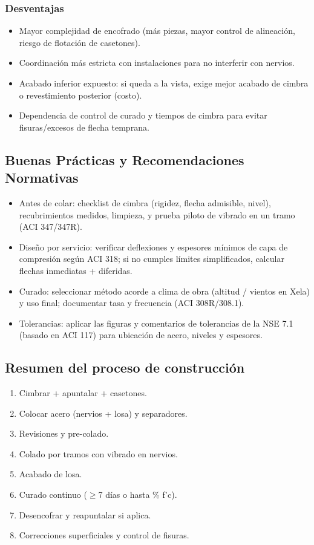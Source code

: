 \documentclass[12pt,a4paper]{article}
\begin{document}
	\subsubsection{Desventajas}
	\begin{itemize}
		\item Mayor complejidad de encofrado (más piezas, mayor control de alineación, riesgo de flotación de casetones).
		\item Coordinación más estricta con instalaciones para no interferir con nervios.
		\item Acabado inferior expuesto: si queda a la vista, exige mejor acabado de cimbra o revestimiento posterior (costo).
		\item Dependencia de control de curado y tiempos de cimbra para evitar fisuras/excesos de flecha temprana.
	\end{itemize}
	
	\subsection{Buenas Prácticas y Recomendaciones Normativas}
	\begin{itemize}
		\item Antes de colar: checklist de cimbra (rigidez, flecha admisible, nivel), recubrimientos medidos, limpieza, y prueba piloto de vibrado en un tramo (ACI 347/347R).
		\item Diseño por servicio: verificar deflexiones y espesores mínimos de capa de compresión según ACI 318; si no cumples límites simplificados, calcular flechas inmediatas + diferidas.
		\item Curado: seleccionar método acorde a clima de obra (altitud / vientos en Xela) y uso final; documentar tasa y frecuencia (ACI 308R/308.1).
		\item Tolerancias: aplicar las figuras y comentarios de tolerancias de la NSE 7.1 (basado en ACI 117) para ubicación de acero, niveles y espesores.
	\end{itemize}
	
	\subsection{Resumen del proceso de construcción}
	\begin{enumerate}
		\item Cimbrar + apuntalar + casetones.
		\item Colocar acero (nervios + losa) y separadores.
		\item Revisiones y pre-colado.
		\item Colado por tramos con vibrado en nervios.
		\item Acabado de losa.
		\item Curado continuo ($\geq$7 días o hasta \% f’c).
		\item Desencofrar y reapuntalar si aplica.
		\item Correcciones superficiales y control de fisuras.
	\end{enumerate}
	
\end{document}

